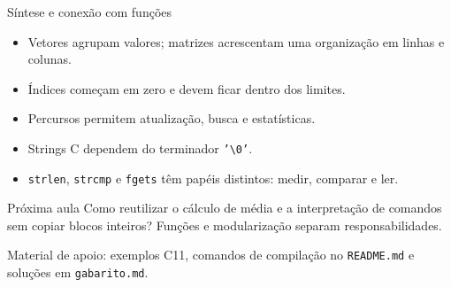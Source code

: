 \begin{frame}{Síntese e conexão com funções}
\begin{itemize}
\item Vetores agrupam valores; matrizes acrescentam uma organização em linhas e colunas.
\item Índices começam em zero e devem ficar dentro dos limites.
\item Percursos permitem atualização, busca e estatísticas.
\item Strings C dependem do terminador \texttt{'\textbackslash 0'}.
\item \texttt{strlen}, \texttt{strcmp} e \texttt{fgets} têm papéis distintos: medir, comparar e ler.
\end{itemize}
\begin{block}{Próxima aula}
Como reutilizar o cálculo de média e a interpretação de comandos sem copiar blocos inteiros? Funções e modularização separam responsabilidades.
\end{block}
\small Material de apoio: exemplos C11, comandos de compilação no \texttt{README.md} e soluções em \texttt{gabarito.md}.
\end{frame}
